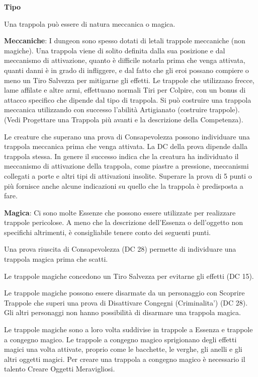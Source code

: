 \documentclass[a4paper,11pt,twoside,openany]{book}
\begin{document}
\textbf{Tipo}

Una trappola può essere di natura meccanica o magica.

\textbf{Meccaniche}: I dungeon sono spesso dotati di letali trappole meccaniche (non magiche). Una trappola viene di solito definita dalla sua posizione e dal meccanismo di attivazione, quanto è difficile notarla prima che venga attivata, quanti danni è in grado di infliggere, e dal fatto che gli eroi possano compiere o meno un Tiro Salvezza per mitigarne gli effetti. Le trappole che utilizzano frecce, lame affilate e altre armi, effettuano normali Tiri per Colpire, con un bonus di attacco specifico che dipende dal tipo di trappola. Si può costruire una trappola meccanica utilizzando con successo l'abilità Artigianato (costruire trappole). (Vedi Progettare una Trappola più avanti e la descrizione della Competenza).

Le creature che superano una prova di Consapevolezza possono individuare una trappola meccanica prima che venga attivata. La DC della prova dipende dalla trappola stessa. In genere il successo indica che la creatura ha individuato il meccanismo di attivazione della trappola, come piastre a pressione, meccanismi collegati a porte e altri tipi di attivazioni insolite. Superare la prova di 5 punti o più fornisce anche alcune indicazioni su quello che la trappola è predisposta a fare.

\textbf{Magica}: Ci sono molte Essenze che possono essere utilizzate per realizzare trappole pericolose. A meno che la descrizione dell'Essenza o dell'oggetto non specifichi altrimenti, è consigliabile tenere conto dei seguenti punti.

Una prova riuscita di Consapevolezza (DC 28) permette di individuare una trappola magica prima che scatti.

Le trappole magiche concedono un Tiro Salvezza per evitarne gli effetti (DC 15).

Le trappole magiche possono essere disarmate da un personaggio con Scoprire Trappole che superi una prova di Disattivare Congegni (Criminalita') (DC 28). Gli altri personaggi non hanno possibilità di disarmare una trappola magica.

Le trappole magiche sono a loro volta suddivise in trappole a Essenza e trappole a congegno magico. Le trappole a congegno magico sprigionano degli effetti magici una volta attivate, proprio come le bacchette, le verghe, gli anelli e gli altri oggetti magici. Per creare una trappola a congegno magico è necessario il talento Creare Oggetti Meravigliosi.
\end{document}
